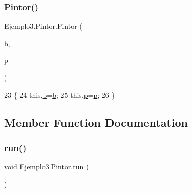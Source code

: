 \subsubsection{\texorpdfstring{Pintor()}{Pintor()}}
{\footnotesize\ttfamily Ejemplo3.\+Pintor.\+Pintor (\begin{DoxyParamCaption}\item[{J\+Button}]{b,  }\item[{\mbox{\hyperlink{class_ejemplo3_1_1_paleta}{Paleta}}}]{p }\end{DoxyParamCaption})\hspace{0.3cm}{\ttfamily [inline]}}


\begin{DoxyCode}
23     \{
24         this.\mbox{\hyperlink{class_ejemplo3_1_1_pintor_a6d590d2c7f652707e7ba3fc0f54e51e3}{b}}=\mbox{\hyperlink{class_ejemplo3_1_1_pintor_a6d590d2c7f652707e7ba3fc0f54e51e3}{b}};
25         this.\mbox{\hyperlink{class_ejemplo3_1_1_pintor_a737a9003af55c987971eb40fd24efbf9}{p}}=\mbox{\hyperlink{class_ejemplo3_1_1_pintor_a737a9003af55c987971eb40fd24efbf9}{p}};
26     \}
\end{DoxyCode}


\subsection{Member Function Documentation}
\mbox{\label{class_ejemplo3_1_1_pintor_a7f939a9eb41a274e0b70803fd52992ab}} 
\subsubsection{\texorpdfstring{run()}{run()}}
{\footnotesize\ttfamily void Ejemplo3.\+Pintor.\+run (\begin{DoxyParamCaption}{ }\end{DoxyParamCaption})\hspace{0.3cm}{\ttfamily [inline]}}


